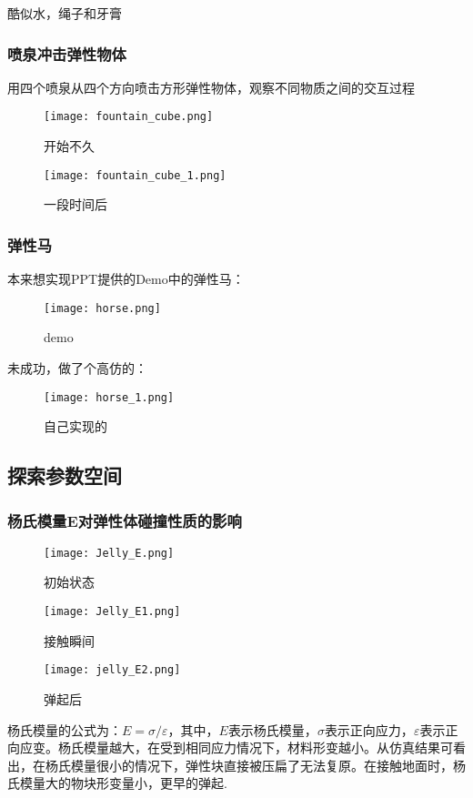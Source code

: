\documentclass[14pt]{scrartcl} %
\begin{document}
酷似水，绳子和牙膏

\pagebreak
\subsubsection{喷泉冲击弹性物体}
用四个喷泉从四个方向喷击方形弹性物体，观察不同物质之间的交互过程
\begin{figure}[h]
	\centering
	\texttt{[image: fountain\_cube.png]} %
	\caption{开始不久}
	
	\centering
	\texttt{[image: fountain\_cube\_1.png]} %
	\caption{一段时间后}
\end{figure}

\pagebreak
\subsubsection{弹性马}
本来想实现PPT提供的Demo中的弹性马：
\begin{figure}[h]
	\centering
	\texttt{[image: horse.png]} %
	\caption{demo}
\end{figure}

未成功，做了个高仿的：
\begin{figure}[h]
	\centering
	\texttt{[image: horse\_1.png]} %
	\caption{自己实现的}
\end{figure}

\pagebreak
\subsection{探索参数空间}
\subsubsection{杨氏模量E对弹性体碰撞性质的影响}
\begin{figure}[h]
	\centering
	\texttt{[image: Jelly\_E.png]} %
	\caption{初始状态}
	
	\centering
	\texttt{[image: Jelly\_E1.png]} %
	\caption{接触瞬间}
	
	\centering
	\texttt{[image: jelly\_E2.png]} %
	\caption{弹起后}
\end{figure}

杨氏模量的公式为：$E=\sigma/\varepsilon$，其中，$E$表示杨氏模量，$\sigma$表示正向应力，$\varepsilon$表示正向应变。杨氏模量越大，在受到相同应力情况下，材料形变越小。从仿真结果可看出，在杨氏模量很小的情况下，弹性块直接被压扁了无法复原。在接触地面时，杨氏模量大的物块形变量小，更早的弹起.
\end{document}
